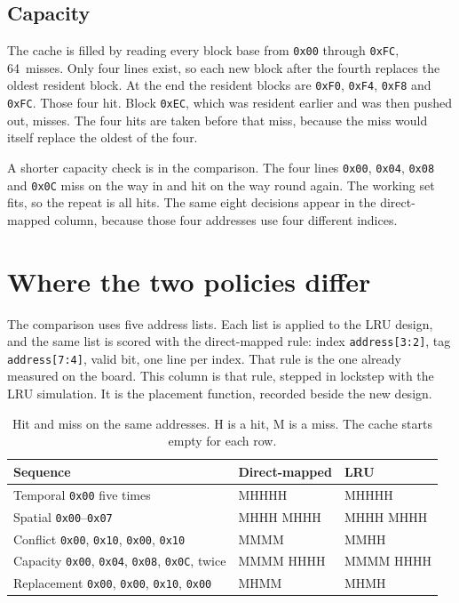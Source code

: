 \documentclass[a4paper,11pt,oneside,headings=small,parskip=half,titlepage=false]{scrreprt}
\begin{document}
\section{Capacity}
\label{sec:capacity}

The cache is filled by reading every block base from \texttt{0x00} through \texttt{0xFC}, 64~misses. Only four lines exist, so each new block after the fourth replaces the oldest resident block. At the end the resident blocks are \texttt{0xF0}, \texttt{0xF4}, \texttt{0xF8} and \texttt{0xFC}. Those four hit. Block \texttt{0xEC}, which was resident earlier and was then pushed out, misses. The four hits are taken before that miss, because the miss would itself replace the oldest of the four.

A shorter capacity check is in the comparison. The four lines \texttt{0x00}, \texttt{0x04}, \texttt{0x08} and \texttt{0x0C} miss on the way in and hit on the way round again. The working set fits, so the repeat is all hits. The same eight decisions appear in the direct-mapped column, because those four addresses use four different indices.

\chapter{Where the two policies differ}
\label{ch:compare}

The comparison uses five address lists. Each list is applied to the LRU design, and the same list is scored with the direct-mapped rule: index \texttt{address[3:2]}, tag \texttt{address[7:4]}, valid bit, one line per index. That rule is the one already measured on the board. This column is that rule, stepped in lockstep with the LRU simulation. It is the placement function, recorded beside the new design.

\begin{table}[ht]
\centering
\caption{Hit and miss on the same addresses. H is a hit, M is a miss. The cache starts empty for each row.}
\label{tab:compare}
\begin{tabular}{lll}
\toprule
Sequence & Direct-mapped & LRU \\
\midrule
Temporal \texttt{0x00} five times & MHHHH & MHHHH \\
Spatial \texttt{0x00}--\texttt{0x07} & MHHH MHHH & MHHH MHHH \\
Conflict \texttt{0x00}, \texttt{0x10}, \texttt{0x00}, \texttt{0x10} & MMMM & MMHH \\
Capacity \texttt{0x00}, \texttt{0x04}, \texttt{0x08}, \texttt{0x0C}, twice & MMMM HHHH & MMMM HHHH \\
Replacement \texttt{0x00}, \texttt{0x00}, \texttt{0x10}, \texttt{0x00} & MHMM & MHMH \\
\bottomrule
\end{tabular}
\end{table}
\end{document}
